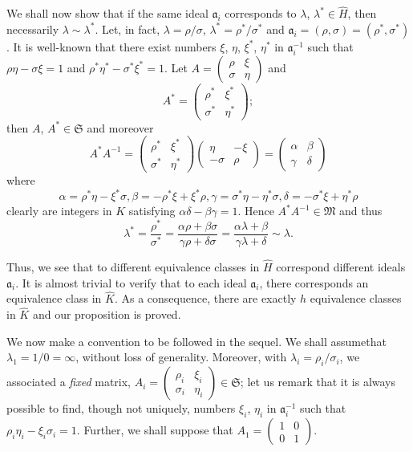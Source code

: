 We shall now show that if the same ideal $\mathfrak{a}_{i}$
corresponds to $\lambda$, $\lambda^{\ast}\in \hat{H}$, then
necessarily $\lambda\sim\lambda^{\ast}$. Let, in fact,
$\lambda=\rho/\sigma$, $\lambda^{\ast}=\rho^{\ast}/\sigma^{\ast}$ and
$\mathfrak{a}_{i}=(\rho,\sigma)=(\rho^{\ast},\sigma^{\ast})$. It is
well-known that there exist numbers $\xi$, $\eta$, $\xi^{\ast}$,
$\eta^{\ast}$ in $\mathfrak{a}^{-1}_{i}$ such that
$\rho\eta-\sigma\xi=1$ and
$\rho^{\ast}\eta^{\ast}-\sigma^{\ast}\xi^{\ast}=1$. Let
$A=\left(\begin{smallmatrix} \rho & \xi\\ \sigma & \eta
\end{smallmatrix}\right)$ and
$$
A^{\ast}=
\begin{pmatrix}
\rho^{\ast} & \xi^{\ast}\\
\sigma^{\ast} & \eta^{\ast}
\end{pmatrix};
$$
then $A$, $A^{\ast}\in\mathfrak{S}$ and moreover
$$
A^{\ast}A^{-1}=
\begin{pmatrix}
\rho^{\ast} & \xi^{\ast}\\
\sigma^{\ast} & \eta^{\ast}
\end{pmatrix}
\begin{pmatrix}
\eta & -\xi\\
-\sigma & \rho
\end{pmatrix}
=
\begin{pmatrix}
\alpha & \beta\\
\gamma & \delta
\end{pmatrix}
$$
where
$$
\alpha=\rho^{\ast}\eta-\xi^{\ast}\sigma,
\beta=-\rho^{\ast}\xi+\xi^{\ast}\rho,
\gamma=\sigma^{\ast}\eta-\eta^{\ast}\sigma,
\delta=-\sigma^{\ast}\xi+\eta^{\ast}\rho
$$
clearly are integers in $K$ satisfying
$\alpha\delta-\beta\gamma=1$. Hence $A^{\ast}A^{-1}\in\mathfrak{M}$
and thus
$$
\lambda^{\ast}=\frac{\rho^{\ast}}{\sigma^{\ast}}=\frac{\alpha\rho+\beta\sigma}{\gamma\rho+\delta\sigma}=\frac{\alpha\lambda+\beta}{\gamma\lambda+\delta}\sim\lambda. 
$$

Thus, we see that to different equivalence classes in $\hat{H}$
correspond different ideals $\mathfrak{a}_{i}$. It is almost trivial
to verify that to each ideal $\mathfrak{a}_{i}$, there corresponds an
equivalence class in $\hat{K}$. As a consequence, there are
exactly $h$ equivalence classes in $\hat{K}$ and our proposition
is proved.

We now make a convention to be followed in the sequel. We shall 
assume\pageoriginale that $\lambda_{1}=1/0=\infty$, without loss of
generality. Moreover, with $\lambda_{i}=\rho_{i}/\sigma_{i}$, we
associated a {\em fixed} matrix, $A_{i}=\left(\begin{smallmatrix}
  \rho_{i} & \xi_{i}\\ \sigma_{i} & \eta_{i}
\end{smallmatrix}\right)\in\mathfrak{S}$; let us remark that it is
always possible to find, though not uniquely, numbers $\xi_{i}$,
$\eta_{i}$ in $\mathfrak{a}^{-1}_{i}$ such that
$\rho_{i}\eta_{i}-\xi_{i}\sigma_{i}=1$. Further, we shall suppose that
$A_{1}=\left(\begin{smallmatrix} 1 &  0\\ 0 & 1
\end{smallmatrix}\right)$.

